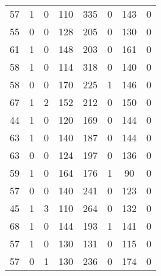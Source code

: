 \documentclass{article}
\begin{document}
\begin{longtable}{*{8}{c}}
57 & 1 & 0 & 110 & 335 & 0 & 143 & 0 \\
55 & 0 & 0 & 128 & 205 & 0 & 130 & 0 \\
61 & 1 & 0 & 148 & 203 & 0 & 161 & 0 \\
58 & 1 & 0 & 114 & 318 & 0 & 140 & 0 \\
58 & 0 & 0 & 170 & 225 & 1 & 146 & 0 \\
67 & 1 & 2 & 152 & 212 & 0 & 150 & 0 \\
44 & 1 & 0 & 120 & 169 & 0 & 144 & 0 \\
63 & 1 & 0 & 140 & 187 & 0 & 144 & 0 \\
63 & 0 & 0 & 124 & 197 & 0 & 136 & 0 \\
59 & 1 & 0 & 164 & 176 & 1 & 90 & 0 \\
57 & 0 & 0 & 140 & 241 & 0 & 123 & 0 \\
45 & 1 & 3 & 110 & 264 & 0 & 132 & 0 \\
68 & 1 & 0 & 144 & 193 & 1 & 141 & 0 \\
57 & 1 & 0 & 130 & 131 & 0 & 115 & 0 \\
57 & 0 & 1 & 130 & 236 & 0 & 174 & 0 \\
\end{longtable}
\end{document}
